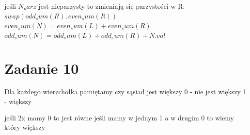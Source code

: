 \documentclass[12pt]{article}
\begin{document}
jeśli $N_parz$ jest nieparzysty to zmieniają się parzystości w R:
$swap(odd_sum(R), even_sum(R))$
$even_sum(N) = even_sum(L) + even_sum(R)$
$odd_sum(N) = odd_sum(L) + odd_sum(R) + N.val$




\section{Zadanie 10}


Dla każdego wierzchołka pamiętamy czy sąsiad jest większy
0 - nie jest większy
1 - większy 

jeśli 2x mamy 0 to jest równe 
jeśli mamy w jednym 1 a w drugim 0 to wiemy który większy

\egroup
\end{document}
